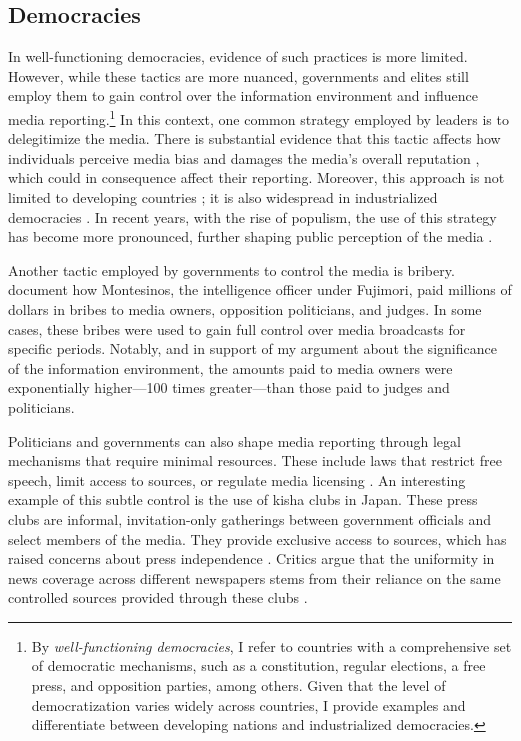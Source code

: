 \subsection{Democracies}

In well-functioning democracies, evidence of such practices is more limited. However, while these tactics are more nuanced, governments and elites still employ them to gain control over the information environment and influence media reporting.\footnote{By \textit{well-functioning democracies}, I refer to countries with a comprehensive set of democratic mechanisms, such as a constitution, regular elections, a free press, and opposition parties, among others. Given that the level of democratization varies widely across countries, I provide examples and differentiate between developing nations and industrialized democracies.} In this context, one common strategy employed by leaders is to delegitimize the media. There is substantial evidence that this tactic affects how individuals perceive media bias and damages the media’s overall reputation \citep{PercMedia-Egelholfer-JoComm, PolNews-Smith-JoPressPol}, which could in consequence affect their reporting. Moreover, this approach is not limited to developing countries \citep{JournIndia-Bhat-Dig, ThugMex-VictorHugo-JourPract}; it is also widespread in industrialized democracies \citep{KoreaJour-Shin-Journalism, PressCriticism-Carlson-Journalism}. In recent years, with the rise of populism, the use of this strategy has become more pronounced, further shaping public perception of the media \citep{PolEconPop-Guriev-JEL}.

Another tactic employed by governments to control the media is bribery. \cite{Peru-Macmillan-JEP} document how Montesinos, the intelligence officer under Fujimori, paid millions of dollars in bribes to media owners, opposition politicians, and judges. In some cases, these bribes were used to gain full control over media broadcasts for specific periods. Notably, and in support of my argument about the significance of the information environment, the amounts paid to media owners were exponentially higher—100 times greater—than those paid to judges and politicians.

Politicians and governments can also shape media reporting through legal mechanisms that require minimal resources. These include laws that restrict free speech, limit access to sources, or regulate media licensing \citep{PolicyBrief-MediaRegulation}. An interesting example of this subtle control is the use of kisha clubs in Japan. These press clubs are informal, invitation-only gatherings between government officials and select members of the media. They provide exclusive access to sources, which has raised concerns about press independence \citep{Kisha-Freedom}. Critics argue that the uniformity in news coverage across different newspapers stems from their reliance on the same controlled sources provided through these clubs \citep{Kisha-UoNott}.  

